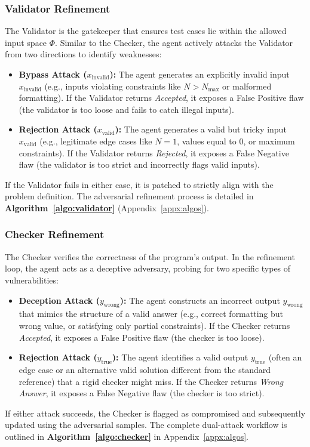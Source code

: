 \documentclass[11pt]{article}
\begin{document}
\subsubsection{Validator Refinement}
The Validator is the gatekeeper that ensures test cases lie within the allowed input space $\Phi$. Similar to the Checker, the agent actively attacks the Validator from two directions to identify weaknesses:
\begin{itemize}
    \item \textbf{Bypass Attack ($x_{\text{invalid}}$):} The agent generates an explicitly invalid input $x_{\text{invalid}}$ (e.g., inputs violating constraints like $N > N_{\max}$ or malformed formatting). If the Validator returns \textit{Accepted}, it exposes a False Positive flaw (the validator is too loose and fails to catch illegal inputs).
    \item \textbf{Rejection Attack ($x_{\text{valid}}$):} The agent generates a valid but tricky input $x_{\text{valid}}$ (e.g., legitimate edge cases like $N=1$, values equal to 0, or maximum constraints). If the Validator returns \textit{Rejected}, it exposes a False Negative flaw (the validator is too strict and incorrectly flags valid inputs).
\end{itemize}
If the Validator fails in either case, it is patched to strictly align with the problem definition.
The adversarial refinement process is detailed in \textbf{Algorithm~\ref{algo:validator}} (Appendix~\ref{appx:algos}).

\subsubsection{Checker Refinement}
The Checker verifies the correctness of the program’s output. In the refinement loop, the agent acts as a deceptive adversary, probing for two specific types of vulnerabilities:
\begin{itemize}
    \item \textbf{Deception Attack ($y_{\text{wrong}}$):} The agent constructs an incorrect output $y_{\text{wrong}}$ that mimics the structure of a valid answer (e.g., correct formatting but wrong value, or satisfying only partial constraints). If the Checker returns \textit{Accepted}, it exposes a False Positive flaw (the checker is too loose).
    \item \textbf{Rejection Attack ($y_{\text{true}}$):} The agent identifies a valid output $y_{\text{true}}$ (often an edge case or an alternative valid solution different from the standard reference) that a rigid checker might miss. If the Checker returns \textit{Wrong Answer}, it exposes a False Negative flaw (the checker is too strict).
\end{itemize}
If either attack succeeds, the Checker is flagged as compromised and subsequently updated using the adversarial samples. The complete dual-attack workflow is outlined in \textbf{Algorithm~\ref{algo:checker}} in Appendix~\ref{appx:algos}.
\end{document}
